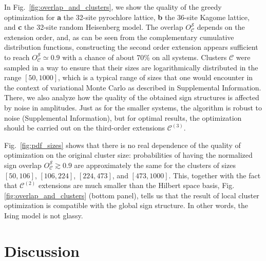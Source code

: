 In Fig.~\ref{fig:overlap_and_clusters}, we show the quality of the greedy optimization for \textbf{a} the 32-site pyrochlore lattice, \textbf{b} the 36-site Kagome lattice, and \textbf{c} the 32-site random Heisenberg model. The overlap $O^\mathcal{S}_\mathcal{C}$ depends on the extension order, and, as can be seen from the complementary cumulative distribution functions, constructing the second order extension appears sufficient to reach $O^\mathcal{S}_\mathcal{C} \simeq 0.9$ with a chance of about 70\% on all systems. Clusters $\mathcal{C}$ were sampled in a way to ensure that their sizes are logarithmically distributed in the range $[50,1000]$, which is a typical range of sizes that one would encounter in the context of variational Monte Carlo as described in Supplemental Information. There, we also analyze how the quality of the obtained sign structures is affected by noise in amplitudes. Just as for the smaller systems, the algorithm is robust to noise (Supplemental Information), but for optimal results, the optimization should be carried out on the third-order extensions ${\mathcal C}^{(3)}$.

Fig.~\ref{fig:pdf_sizes} shows that there is no real dependence of the quality of optimization on the original cluster size: probabilities of having the normalized sign overlap $O^\mathcal{S}_\mathcal{C} \gtrsim 0.9$ are approximately the same for the clusters of sizes $[50, 106]$, $[106, 224]$, $[224, 473]$, and $[473, 1000]$. This, together with the fact that $\mathcal{C}^{(2)}$ extensions are much smaller than the Hilbert space basis, Fig. \ref{fig:overlap_and_clusters} (bottom panel), tells us that the result of local cluster optimization is compatible with the global sign structure. In other words, the Ising model is not glassy. 


\section{Discussion}

